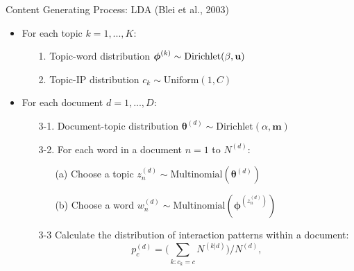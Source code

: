 \documentclass[10pt]{beamer}
\def\bni{\begin{itemize}} \def\ei{\end{itemize}}
\theoremstyle{definition}
\theoremstyle{remark}
\begin{document}
\begin{frame}{Content Generating Process: LDA (Blei et al., 2003)}
\bni 
\item For each topic $k =1,...,K:$\vspace{0.2cm}
	\begin{itemize}
		\item[1.] Topic-word distribution {$\boldsymbol{\phi}^{(k)} \sim \mbox{Dirichlet}(\beta, \bf u)$}\vspace{0.2cm}
		\item[2.] Topic-IP distribution $c_k\sim \mbox{Uniform}(1, C)$			
		\end{itemize}\vspace{0.4cm}
\item For each document $d =1,...,D:$ \vspace{0.2cm}
	\begin{itemize}
\item[3-1.] Document-topic distribution $\boldsymbol{\theta}^{(d)}\sim \mbox{Dirichlet}(\alpha, \boldsymbol{m})$\vspace{0.2cm}
		\item[3-2.] For each word in a document $n=1$ to $N^{(d)}$:
		\begin{itemize}
			\item[(a)] Choose a topic $z_n^{(d)} \sim \mbox{Multinomial}(\boldsymbol{\theta}^{(d)})$
			\item[(b)] Choose a word $w_n^{(d)} \sim\mbox{Multinomial} (\boldsymbol{\phi}^{(z_n^{(d)})})$
		\end{itemize} \vspace{0.2cm}
		\item[3-3] Calculate the distribution of interaction patterns within a document:
		 \footnotesize\begin{equation}
		p_c^{(d)} = \Big({\sum\limits_{k: c_k=c} N^{(k|d)}}\Big)/{N^{(d)}},
		\end{equation}\normalsize
	\end{itemize}
\ei	
\end{frame}
\end{document}
